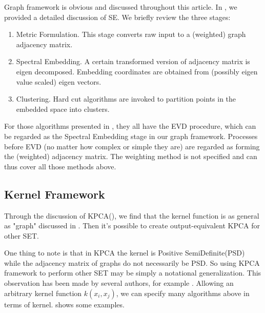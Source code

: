 Graph framework is obvious and discussed throughout this article. 
In \rsec{\ref{sec:framework}}, we provided a detailed discussion 
of SE. We briefly review the three stages:
\begin{enumerate}
	\item Metric Formulation. This stage converts raw input 
	to a (weighted) graph adjacency matrix. 
	\item Spectral Embedding. A certain transformed version of 
	adjacency matrix is eigen decomposed. Embedding coordinates
	are obtained from (possibly eigen value scaled) eigen vectors. 
	\item Clustering. Hard cut algorithms are invoked to 
	partition points in the embedded space into clusters.  
\end{enumerate}

For those algorithms presented in \rsec{\ref{sec:nldr}}, 
they all have the EVD procedure, which can be regarded as 
the Spectral Embedding stage in our graph framework. 
Processes before EVD (no matter how complex or simple they are) 
are regarded as forming the (weighted) adjacency matrix. 
The weighting method is not specified and can thus cover
all those methods above. 

\subsection{Kernel Framework}
\label{sec:kfx}

Through the discussion of KPCA(\rsec{\ref{sec:kpca}}), 
we find that the kernel function is as general as "graph" 
discussed in \rsec{\ref{sec:gfx}}. Then it's possible  
to create output-equivalent KPCA for other SET. 

One thing to note is that in KPCA the kernel is Positive 
SemiDefinite(PSD) while the adjacency matrix of graphs
do not necessarily be PSD. So using KPCA framework to 
perform other SET may be simply a notational generalization. 
This observation has been made by several authors, for example
\cite{bengio2004learning}\cite{bengio2006spectral}\cite{ham2004kernel}. 
Allowing an arbitrary kernel function $ k(x_i,x_j) $, 
we can specify many algorithms above in terms of kernel. 
\rtbl{\ref{tbl:kernel}} shows some examples. 

